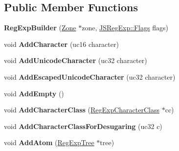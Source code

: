 \subsection*{Public Member Functions}
\begin{DoxyCompactItemize}
\item 
\mbox{\label{classv8_1_1internal_1_1RegExpBuilder_a48cf63c79f8bd7d93c12bdf2e2d2f6cd}} 
{\bfseries Reg\+Exp\+Builder} (\mbox{\hyperlink{classv8_1_1internal_1_1Zone}{Zone}} $\ast$zone, \mbox{\hyperlink{classv8_1_1base_1_1Flags}{J\+S\+Reg\+Exp\+::\+Flags}} flags)
\item 
\mbox{\label{classv8_1_1internal_1_1RegExpBuilder_a32147135c6698790960b719446a1fe28}} 
void {\bfseries Add\+Character} (uc16 character)
\item 
\mbox{\label{classv8_1_1internal_1_1RegExpBuilder_a8491eb3bdec11ed728ed6f75d111c161}} 
void {\bfseries Add\+Unicode\+Character} (uc32 character)
\item 
\mbox{\label{classv8_1_1internal_1_1RegExpBuilder_aa3ab437321a59b2b20165331aa19ac0b}} 
void {\bfseries Add\+Escaped\+Unicode\+Character} (uc32 character)
\item 
\mbox{\label{classv8_1_1internal_1_1RegExpBuilder_aa1d8f7f7665968635496315908e83400}} 
void {\bfseries Add\+Empty} ()
\item 
\mbox{\label{classv8_1_1internal_1_1RegExpBuilder_a56716958758a46118b99c0afd32307a4}} 
void {\bfseries Add\+Character\+Class} (\mbox{\hyperlink{classv8_1_1internal_1_1RegExpCharacterClass}{Reg\+Exp\+Character\+Class}} $\ast$cc)
\item 
\mbox{\label{classv8_1_1internal_1_1RegExpBuilder_a6b1b6671b0ee0266e618cf980f633855}} 
void {\bfseries Add\+Character\+Class\+For\+Desugaring} (uc32 c)
\item 
\mbox{\label{classv8_1_1internal_1_1RegExpBuilder_a48849cf1f137252fa4d49cf682f924c6}} 
void {\bfseries Add\+Atom} (\mbox{\hyperlink{classv8_1_1internal_1_1RegExpTree}{Reg\+Exp\+Tree}} $\ast$tree)

\end{DoxyCompactItemize}
